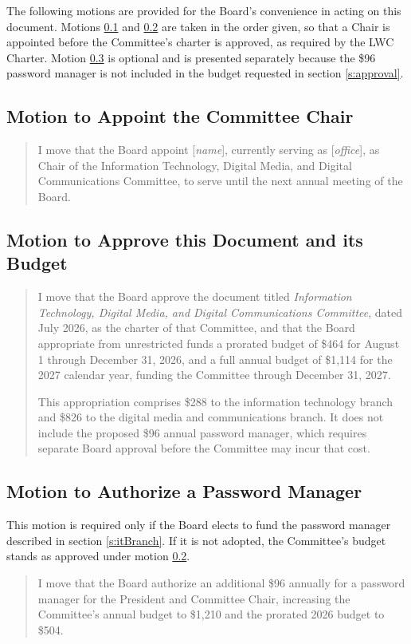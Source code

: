 \documentclass[letterpaper,11pt,leqno]{article}
\begin{document}
The following motions are provided for the Board's convenience in acting on this document. Motions \ref{a:motionChair} and \ref{a:motionApprove} are taken in the order given, so that a Chair is appointed before the Committee's charter is approved, as required by the LWC Charter. Motion \ref{a:motionPassword} is optional and is presented separately because the \$96 password manager is not included in the budget requested in section \ref{s:approval}.

\subsection{Motion to Appoint the Committee Chair}\label{a:motionChair}

\begin{quote}
I move that the Board appoint [\emph{name}], currently serving as [\emph{office}], as Chair of the Information Technology, Digital Media, and Digital Communications Committee, to serve until the next annual meeting of the Board.
\end{quote}

\subsection{Motion to Approve this Document and its Budget}\label{a:motionApprove}

\begin{quote}
I move that the Board approve the document titled \emph{Information Technology, Digital Media, and Digital Communications Committee}, dated July 2026, as the charter of that Committee, and that the Board appropriate from unrestricted funds a prorated budget of \$464 for August 1 through December 31, 2026, and a full annual budget of \$1,114 for the 2027 calendar year, funding the Committee through December 31, 2027.

This appropriation comprises \$288 to the information technology branch and \$826 to the digital media and communications branch. It does not include the proposed \$96 annual password manager, which requires separate Board approval before the Committee may incur that cost.
\end{quote}

\subsection{Motion to Authorize a Password Manager}\label{a:motionPassword}

This motion is required only if the Board elects to fund the password manager described in section \ref{s:itBranch}. If it is not adopted, the Committee's budget stands as approved under motion \ref{a:motionApprove}.

\begin{quote}
I move that the Board authorize an additional \$96 annually for a password manager for the President and Committee Chair, increasing the Committee's annual budget to \$1,210 and the prorated 2026 budget to \$504.
\end{quote}


\end{document}
